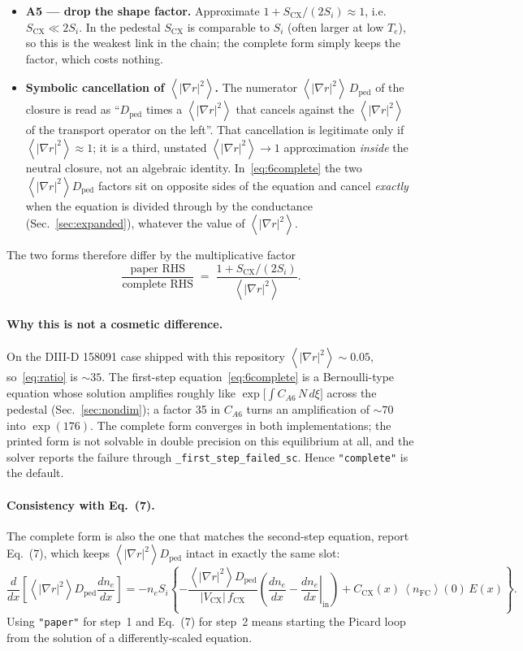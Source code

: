 \documentclass[11pt]{article}
\renewcommand{\ne}{n_{e}}  %
\newcommand{\nfc}{n_{\mathrm{FC}}}
\newcommand{\Vcx}{\lvert V_{\mathrm{CX}}\rvert}
\newcommand{\Si}{S_{i}}
\newcommand{\Scx}{S_{\mathrm{CX}}}
\newcommand{\Dped}{D_{\mathrm{ped}}}
\newcommand{\fCX}{f_{\mathrm{CX}}}
\newcommand{\fsa}[1]{\left\langle #1 \right\rangle}
\newcommand{\gradrsq}{\fsa{|\nabla r|^{2}}}
\newcommand{\dnein}{\left.\frac{d\ne}{dx}\right|_{\mathrm{in}}}
\begin{document}
\begin{itemize}
  \item \textbf{A5 --- drop the shape factor.}  Approximate
        $1+\Scx/(2\Si)\approx1$, i.e.\ $\Scx\ll2\Si$.  In the pedestal
        $\Scx$ is comparable to $\Si$ (often larger at low $T_e$), so this
        is the weakest link in the chain; the complete form simply keeps
        the factor, which costs nothing.
  \item \textbf{Symbolic cancellation of $\gradrsq$.}  The numerator
        $\gradrsq\,\Dped$ of the closure is read as ``$\Dped$ times a
        $\gradrsq$ that cancels against the $\gradrsq$ of the transport
        operator on the left''.  That cancellation is legitimate only if
        $\gradrsq\approx1$; it is a third, unstated $\gradrsq\to1$
        approximation \emph{inside} the neutral closure, not an algebraic
        identity.  In~\eqref{eq:6complete} the two $\gradrsq\Dped$ factors
        sit on opposite sides of the equation and cancel \emph{exactly}
        when the equation is divided through by the conductance
        (Sec.~\ref{sec:expanded}), whatever the value of $\gradrsq$.
\end{itemize}

The two forms therefore differ by the multiplicative factor
\begin{equation}
  \frac{\text{paper RHS}}{\text{complete RHS}}
    \;=\; \frac{1+\Scx/(2\Si)}{\gradrsq}.
  \label{eq:ratio}
\end{equation}

\paragraph{Why this is not a cosmetic difference.}
On the DIII-D 158091 case shipped with this repository
$\gradrsq \sim 0.05$, so~\eqref{eq:ratio} is ${\sim}35$.  The first-step
equation~\eqref{eq:6complete} is a
Bernoulli-type equation whose solution amplifies roughly like
$\exp\bigl[\int C_{A6}\,N\,d\xi\bigr]$ across the pedestal
(Sec.~\ref{sec:nondim}); a factor 35 in $C_{A6}$ turns an amplification of
$\sim\!70$ into $\exp(176)$.  The complete form converges in both
implementations; the printed form is not solvable in double precision on
this equilibrium at all, and the solver reports the failure through
\texttt{\_first\_step\_failed\_sc}.  Hence \texttt{"complete"} is the
default.

\paragraph{Consistency with Eq.~(7).}  The complete form is also the one
that matches the second-step equation, report Eq.~(7), which keeps
$\gradrsq\Dped$ intact in exactly the same slot:
\[
  \frac{d}{dx}\!\left[\gradrsq\Dped\frac{d\ne}{dx}\right]
   = -\ne\Si\left\{-\frac{\gradrsq\Dped}{\Vcx\,\fCX}
     \left(\frac{d\ne}{dx}-\dnein\right)
     + C_{\mathrm{CX}}(x)\,\fsa{\nfc}(0)\,E(x)\right\}.
\]
Using \texttt{"paper"} for step~1 and Eq.~(7) for step~2 means starting the
Picard loop from the solution of a differently-scaled equation.
\end{document}

